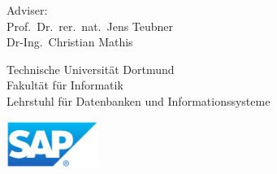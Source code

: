 \hspace*{\links}
\begin{minipage}[b]{6cm}
\normalsize
\normalfont
\raggedright
Adviser: \\
Prof.\ Dr.\ rer.\ nat.\ Jens Teubner\\
Dr-Ing.\ Christian Mathis\\
\end{minipage}

\vspace*{2.5cm}
\hspace*{\links}
\begin{minipage}[b]{8cm}
\normalsize
\normalfont
\raggedright
Technische Universität Dortmund\\
Fakultät für Informatik\\
Lehrstuhl für Datenbanken und Informationssysteme
\end{minipage}
\begin{minipage}{8cm}
\hspace{2cm}\vspace{2cm}
\includegraphics[width=3cm]{images/SAP_2011_Logo}
\end{minipage}
